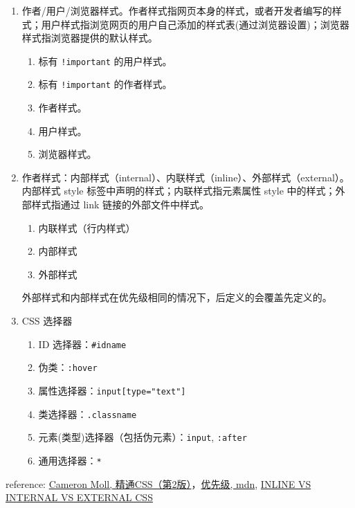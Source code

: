 \begin{enumerate}
\def\labelenumi{\arabic{enumi}.}
\tightlist
\item
  作者/用户/浏览器样式。作者样式指网页本身的样式，或者开发者编写的样式；用户样式指浏览网页的用户自己添加的样式表(通过浏览器设置)；浏览器样式指浏览器提供的默认样式。

  \begin{enumerate}
  \def\labelenumii{\arabic{enumii}.}
  \tightlist
  \item
    标有 \lstinline"!important" 的用户样式。
  \item
    标有 \lstinline"!important" 的作者样式。
  \item
    作者样式。
  \item
    用户样式。
  \item
    浏览器样式。
  \end{enumerate}
\item
  作者样式：内部样式（internal）、内联样式（inline）、外部样式（external）。内部样式
  style 标签中声明的样式；内联样式指元素属性 style
  中的样式；外部样式指通过 link 链接的外部文件中样式。

  \begin{enumerate}
  \def\labelenumii{\arabic{enumii}.}
  \tightlist
  \item
    内联样式（行内样式）
  \item
    内部样式
  \item
    外部样式
  \end{enumerate}

  外部样式和内部样式在优先级相同的情况下，后定义的会覆盖先定义的。
\item
  CSS 选择器

  \begin{enumerate}
  \def\labelenumii{\arabic{enumii}.}
  \tightlist
  \item
    ID 选择器：\lstinline!#idname!
  \item
    伪类：\lstinline!:hover!
  \item
    属性选择器：\lstinline!input[type="text"]!
  \item
    类选择器：\lstinline!.classname!
  \item
    元素(类型)选择器（包括伪元素）：\lstinline!input!,
    \lstinline!:after!
  \item
    通用选择器：\lstinline!*!
  \end{enumerate}
\end{enumerate}

reference: \href{http://book.douban.com/subject/4736167/}{Cameron Moll,
精通CSS（第2版）}，\href{https://developer.mozilla.org/zh-CN/docs/Web/CSS/Specificity}{优先级,
mdn},
\href{https://vineetgupta22.wordpress.com/2011/07/09/inline-vs-internal-vs-external-css/}{INLINE
VS INTERNAL VS EXTERNAL CSS}

